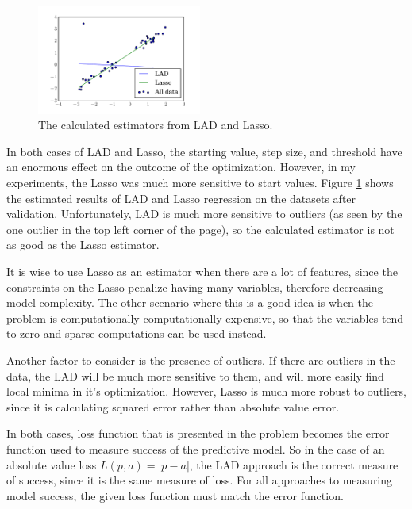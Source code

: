 \documentclass[10pt]{article}
\begin{document}
\begin{figure}[!ht]
	\begin{center}
	\includegraphics[width=0.48\textwidth]{exercise4-3.pdf}
	\caption{The calculated estimators from LAD and Lasso.}
	\label{fig:4-3}
	\end{center}
\end{figure}

In both cases of LAD and Lasso, the starting value, step size, and threshold have an enormous effect on the outcome of the optimization. However, in my experiments, the Lasso was much more sensitive to start values. Figure \ref{fig:4-3} shows the estimated results of LAD and Lasso regression on the datasets after validation. Unfortunately, LAD is much more sensitive to outliers (as seen by the one outlier in the top left corner of the page), so the calculated estimator is not as good as the Lasso estimator. 

It is wise to use Lasso as an estimator when there are a lot of features, since the constraints on the Lasso penalize having many variables, therefore decreasing model complexity. The other scenario where this is a good idea is when the problem is computationally computationally expensive, so that the variables tend to zero and sparse computations can be used instead. 

Another factor to consider is the presence of outliers. If there are outliers in the data, the LAD will be much more sensitive to them, and will more easily find local minima in it's optimization. However, Lasso is much more robust to outliers, since it is calculating squared error rather than absolute value error.

In both cases, loss function that is presented in the problem becomes the error function used to measure success of the predictive model. So in the case of an absolute value loss $L(p, a) = |p - a|$, the LAD approach is the correct measure of success, since it is the same measure of loss. For all approaches to measuring model success, the given loss function must match the error function. 
\end{document}
